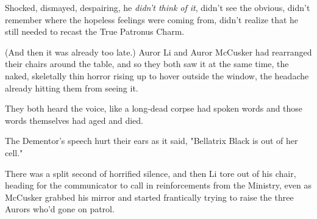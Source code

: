 Shocked, dismayed, despairing, he \emph{didn't think of it}, didn't see the 
obvious, didn't remember where the hopeless feelings were coming from, didn't 
realize that he still needed to recast the True Patronus Charm.

(And then it was already too late.)
\sbreak
Auror Li and Auror McCusker had rearranged their chairs around the table, and 
so they both saw it at the same time, the naked, skeletally thin horror rising 
up to hover outside the window, the headache already hitting them from seeing 
it.

They both heard the voice, like a long-dead corpse had spoken words and those 
words themselves had aged and died.

The Dementor's speech hurt their ears as it said, "Bellatrix Black is out of 
her cell."

There was a split second of horrified silence, and then Li tore out of his 
chair, heading for the communicator to call in reinforcements from the 
Ministry, even as McCusker grabbed his mirror and started frantically trying to 
raise the three Aurors who'd gone on patrol.
